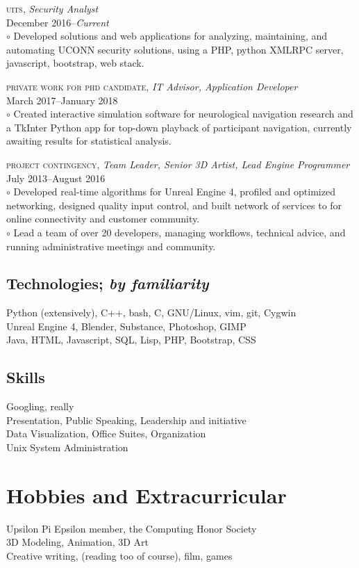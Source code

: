 \documentclass[Letterpaper,11pt]{article}
\begin{document}
    \textsc{uits}, 
    \textit{Security Analyst}\\
    December 2016--\textit{Current}\\
        $\circ$ Developed solutions and web applications for analyzing, maintaining, and automating UCONN security solutions, using a PHP, python XMLRPC server, javascript, bootstrap, web stack.

    \textsc{private work for phd candidate}, 
    \textit{IT Advisor, Application Developer}\\
    March 2017--January 2018\\
        $\circ$ Created interactive simulation software for neurological navigation research and a TkInter Python app for top-down playback of participant navigation, currently awaiting results for statistical analysis.
        
    \textsc{project contingency}, 
    \textit{Team Leader, Senior 3D Artist, Lead Engine Programmer}\\
    July 2013--August 2016\\
        $\circ$ Developed real-time algorithms for Unreal Engine 4, profiled and optimized networking, designed quality input control, and built network of services to for online connectivity and customer community.
        \\
        $\circ$ Lead a team of over 20 developers, managing workflows, technical advice, and running administrative meetings and community.
        
\begin{multicols}{2}

    \subsection*{Technologies; \textit{by familiarity}}
    
        Python (extensively), C++, bash, C, GNU/Linux, vim, git, Cygwin
        \\
        Unreal Engine 4, Blender, Substance, Photoshop, GIMP
        \\
        Java, HTML, Javascript, SQL, Lisp, PHP, Bootstrap, CSS 
    
    \subsection*{Skills}
    
        Googling, really\\
        Presentation, Public Speaking, Leadership and initiative\\
        Data Visualization, Office Suites, Organization\\
        Unix System Administration\\
    
\end{multicols}

\section*{Hobbies and Extracurricular}

    Upsilon Pi Epsilon member, the Computing Honor Society\\
    3D Modeling, Animation, 3D Art\\
    Creative writing, (reading too of course), film, games
    
\clearpage
\end{document}
